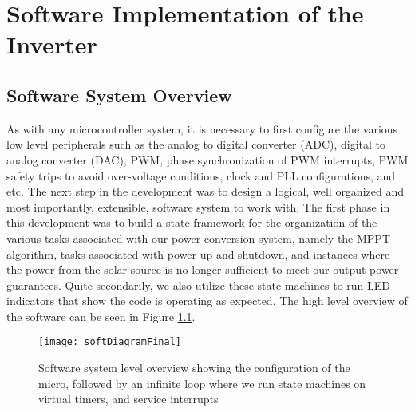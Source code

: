 
\chapter{Software Implementation of the Inverter} %

\label{Chapter3} %



\section{Software System Overview}
\label{softOver}
As with any microcontroller system, it is necessary to first configure the various low level peripherals such as the analog to digital converter (ADC), digital to analog converter (DAC), PWM, phase synchronization of PWM interrupts, PWM safety trips to avoid over-voltage conditions, clock and PLL configurations, and etc. The next step in the development was to design a logical, well organized and most importantly, extensible, software system to work with. The first phase in this development was to build a state framework for the organization of the various tasks associated with our power conversion system, namely the MPPT algorithm, tasks associated with power-up and shutdown, and instances where the power from the solar source is no longer sufficient to meet our output power guarantees. Quite secondarily, we also utilize these state machines to run LED indicators that show the code is operating as expected. The high level overview of the software can be seen in Figure \ref{soft}.

\begin{figure}[htp]
\begin{center}
\texttt{[image: softDiagramFinal]}
\caption{Software system level overview showing the configuration of the micro, followed by an infinite loop where we run state machines on virtual timers, and service interrupts}
\label{soft}
\end{center}
\end{figure}

